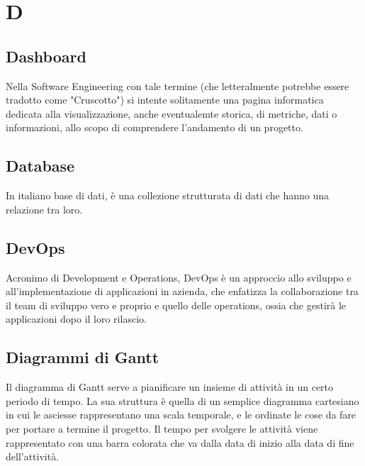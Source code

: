\section*{D}

\subsection{Dashboard}
Nella Software Engineering con tale termine (che letteralmente potrebbe essere tradotto come "Cruscotto") si intente solitamente una pagina  informatica dedicata alla visualizzazione, anche eventualemte storica, di metriche, dati o informazioni, allo scopo di comprendere l'andamento di un progetto.

\subsection{Database}
In italiano base di dati, è una collezione strutturata di dati che hanno una relazione tra loro.

\subsection{DevOps}
Acronimo di Development e Operations, DevOps è un approccio allo sviluppo e all’implementazione di applicazioni in azienda, che enfatizza la collaborazione tra il team di sviluppo vero e proprio e quello delle operations, ossia che gestirà le applicazioni dopo il loro rilascio.

\subsection{Diagrammi di Gantt}
Il diagramma di Gantt serve a pianificare un insieme di attività in un certo periodo di tempo. La sua struttura è quella di un semplice diagramma cartesiano in cui le asciesse rappresentano una scala temporale, e le ordinate le cose da fare per portare a termine il progetto. Il tempo per svolgere le attività viene rappresentato con una barra colorata che va dalla data di inizio alla data di fine dell'attività.

